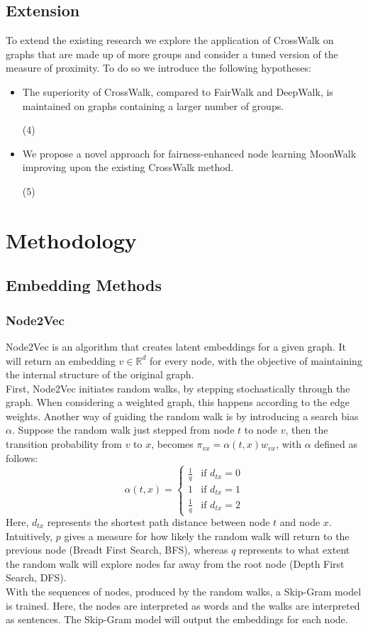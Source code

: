 \subsection{Extension}
To extend the existing research we explore the application of CrossWalk on graphs that are made up of more groups and consider a tuned version of the measure of proximity. To do so we introduce the following hypotheses:
\begin{itemize}
    \item \parbox{11cm}{The superiority of CrossWalk, compared to FairWalk and DeepWalk,  is maintained on graphs containing a larger number of groups.} {\makebox[1cm]{\hfill} \label{claim4}(4)}
    \item \parbox{11cm}{We propose a novel approach for fairness-enhanced node learning MoonWalk improving upon the existing CrossWalk method.} {\makebox[1cm]{\hfill} \label{claim5}(5)}
\end{itemize}
\section{Methodology}
\subsection{Embedding Methods}
\subsubsection{Node2Vec}
Node2Vec \cite{node2vec} is an algorithm that creates latent embeddings for a given graph. It will return an embedding $v \in \mathbb{R}^d$ for every node, with the objective of maintaining the internal structure of the original graph.\\
First, Node2Vec initiates random walks, by stepping stochastically through the graph. When considering a weighted graph, this happens according to the edge weights. Another way of guiding the random walk is by introducing a search bias $\alpha$. Suppose the random walk just stepped from node $t$ to node $v$, then the transition probability from $v$ to $x$, becomes $\pi_{vx} = \alpha(t, x) w_{vx}$, with $\alpha$ defined as follows:
\begin{equation}
\alpha(t,x)=
    \begin{cases}
      \frac{1}{q} & \text{if $d_{tx} = 0$}\\
      1 & \text{if $d_{tx} = 1$}\\
      \frac{1}{q} & \text{if $d_{tx} = 2$}
    \end{cases} 
    \label{eq:node2vec}
\end{equation}
Here, $d_{tx}$ represents the shortest path distance between node $t$ and node $x$. Intuitively, $p$ gives a measure for how likely the random walk will return to the previous node (Breadt First Search, BFS), whereas $q$ represents to what extent the random walk will explore nodes far away from the root node (Depth First Search, DFS)\cite{node2vec}.\\
With the sequences of nodes, produced by the random walks, a Skip-Gram \cite{skipgram} model is trained. Here, the nodes are interpreted as words and the walks are interpreted as sentences. The Skip-Gram model will output the embeddings for each node.

